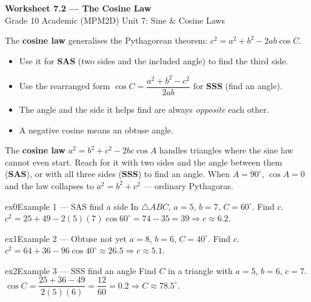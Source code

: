 \documentclass[11pt]{article}
\begin{document}
\begin{center}
{\LARGE\bfseries\color{titleblue}Worksheet 7.2 --- The Cosine Law}\\[2pt]
{\small Grade 10 Academic (MPM2D) \textperiodcentered{} Unit 7: Sine \& Cosine Laws}
\end{center}

\begin{ideabox}
The \textbf{cosine law} generalises the Pythagorean theorem: $c^2=a^2+b^2-2ab\cos C$.
\begin{itemize}[leftmargin=*,itemsep=2pt]
  \item Use it for \textbf{SAS} (two sides and the included angle) to find the third side.
  \item Use the rearranged form $\cos C=\dfrac{a^2+b^2-c^2}{2ab}$ for \textbf{SSS} (find an angle).
  \item The angle and the side it helps find are always \emph{opposite} each other.
  \item A negative cosine means an obtuse angle.
\end{itemize}
\end{ideabox}

\begin{learnbox}
The \textbf{cosine law} $a^2=b^2+c^2-2bc\cos A$ handles triangles where the sine law cannot even start.
Reach for it with two sides and the angle between them (\textbf{SAS}), or with all three sides (\textbf{SSS}) to find an angle.
When $A=90^\circ$, $\cos A=0$ and the law collapses to $a^2=b^2+c^2$ — ordinary Pythagoras.
\end{learnbox}


\begin{example}{ex0}{Example 1 --- SAS find a side}
In $\triangle ABC$, $a=5$, $b=7$, $C=60^\circ$. Find $c$.
\soln $c^2=25+49-2(5)(7)\cos60^\circ=74-35=39\Rightarrow c\approx6.2.$
\end{example}

\begin{example}{ex1}{Example 2 --- Obtuse not yet}
$a=8$, $b=6$, $C=40^\circ$. Find $c$.
\soln $c^2=64+36-96\cos40^\circ\approx26.5\Rightarrow c\approx5.1.$
\end{example}

\begin{example}{ex2}{Example 3 --- SSS find an angle}
Find $C$ in a triangle with $a=5$, $b=6$, $c=7$.
\soln $\cos C=\dfrac{25+36-49}{2(5)(6)}=\dfrac{12}{60}=0.2\Rightarrow C\approx78.5^\circ.$
\end{example}
\end{document}

